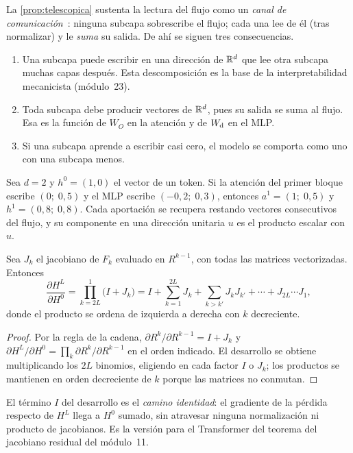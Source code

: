 La \cref{prop:telescopica} sustenta la lectura del flujo como un \emph{canal de comunicación}~\cite{elhage}: ninguna subcapa sobrescribe el flujo; cada una lee de él (tras normalizar) y le \emph{suma} su salida. De ahí se siguen tres consecuencias.
\begin{enumerate}
  \item Una subcapa puede escribir en una dirección de $\mathbb{R}^{d}$ que lee otra subcapa muchas capas después. Esta descomposición es la base de la interpretabilidad mecanicista (módulo~23).
  \item Toda subcapa debe producir vectores de $\mathbb{R}^{d}$, pues su salida se suma al flujo. Esa es la función de $W_O$ en la atención y de $W_{\mathrm{d}}$ en el MLP.
  \item Si una subcapa aprende a escribir casi cero, el modelo se comporta como uno con una subcapa menos.
\end{enumerate}

\begin{ejemplo}\label{ej:aportaciones}
Sea $d=2$ y $h^{0}=(1,0)$ el vector de un token. Si la atención del primer bloque escribe $(0;\;0{,}5)$ y el MLP escribe $(-0{,}2;\;0{,}3)$, entonces $a^{1}=(1;\;0{,}5)$ y $h^{1}=(0{,}8;\;0{,}8)$. Cada aportación se recupera restando vectores consecutivos del flujo, y su componente en una dirección unitaria $u$ es el producto escalar con $u$.
\end{ejemplo}

\begin{proposicion}\label{prop:jac-flujo}
Sea $J_k$ el jacobiano de $F_k$ evaluado en $R^{k-1}$, con todas las matrices vectorizadas. Entonces
\[
\frac{\partial H^{L}}{\partial H^{0}}=\prod_{k=2L}^{1}\bigl(I+J_k\bigr)=I+\sum_{k=1}^{2L}J_k+\sum_{k>k'}J_kJ_{k'}+\cdots+J_{2L}\cdots J_1,
\]
donde el producto se ordena de izquierda a derecha con $k$ decreciente.
\end{proposicion}

\begin{proof}
Por la regla de la cadena, $\partial R^{k}/\partial R^{k-1}=I+J_k$ y $\partial H^{L}/\partial H^{0}=\prod_{k}\partial R^{k}/\partial R^{k-1}$ en el orden indicado. El desarrollo se obtiene multiplicando los $2L$ binomios, eligiendo en cada factor $I$ o $J_k$; los productos se mantienen en orden decreciente de $k$ porque las matrices no conmutan.
\end{proof}

El término $I$ del desarrollo es el \emph{camino identidad}: el gradiente de la pérdida respecto de $H^{L}$ llega a $H^{0}$ sumado, sin atravesar ninguna normalización ni producto de jacobianos. Es la versión para el Transformer del teorema del jacobiano residual del módulo~11.

